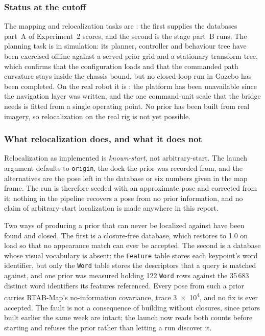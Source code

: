 \subsubsection{Status at the cutoff}

The mapping and relocalization tasks are : the first
supplies the databases part~A of Experiment~2 scores, and the second is the
stage part~B runs. The planning task is
 in simulation: its planner, controller and behaviour tree
have been exercised offline against a served prior grid and a stationary
transform tree, which confirms that the configuration loads and that the
commanded path curvature stays inside the chassis bound, but no closed-loop run
in Gazebo has been completed. On the real robot it is : the
platform has been unavailable since the navigation layer was written, and the
one command-unit scale that the bridge needs is fitted from a single operating
point. No prior has been built from real imagery, so relocalization on the real
rig is not yet possible.

\subsubsection{What relocalization does, and what it does not}
\label{sec:reloc-limits}

Relocalization as implemented is \emph{known-start}, not arbitrary-start. The
launch argument  defaults to \texttt{origin}, the dock the
prior was recorded from, and the alternatives are the pose left in the database
or six numbers given in the map frame. The run is therefore
seeded with an approximate pose and corrected from it; nothing in the pipeline
recovers a pose from no prior information, and no claim of arbitrary-start
localization is made anywhere in this report.

Two ways of producing a prior that can never be localized against have been
found and closed. The first is a closure-free database, which restores
 to 1.0 on load so that no appearance match can ever be
accepted. The second is a database whose visual vocabulary is absent: the
\texttt{Feature} table stores each keypoint's word identifier, but only the
\texttt{Word} table stores the descriptors that a query is matched against, and
one prior was measured holding 122 \texttt{Word} rows
against the 35\,683 distinct word identifiers its features referenced. Every
pose from such a prior carries RTAB-Map's no-information covariance, trace
\num{3e4}, and no fix is ever accepted. The fault is not a consequence of
building without closures, since priors built earlier the same week are intact;
the launch now reads both counts before starting and refuses the prior rather
than letting a run discover it.

